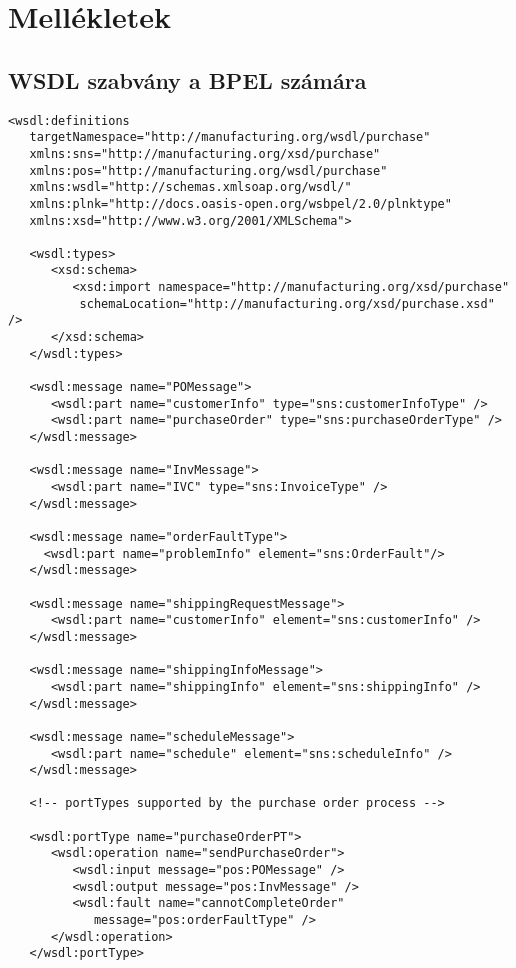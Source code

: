 \chapter{Mellékletek}

\section{WSDL szabvány a BPEL számára}
\begin{verbatim}
<wsdl:definitions
   targetNamespace="http://manufacturing.org/wsdl/purchase"
   xmlns:sns="http://manufacturing.org/xsd/purchase"
   xmlns:pos="http://manufacturing.org/wsdl/purchase"
   xmlns:wsdl="http://schemas.xmlsoap.org/wsdl/"
   xmlns:plnk="http://docs.oasis-open.org/wsbpel/2.0/plnktype"
   xmlns:xsd="http://www.w3.org/2001/XMLSchema">
   
   <wsdl:types>
      <xsd:schema>
         <xsd:import namespace="http://manufacturing.org/xsd/purchase"
          schemaLocation="http://manufacturing.org/xsd/purchase.xsd" />
      </xsd:schema>
   </wsdl:types> 

   <wsdl:message name="POMessage">
      <wsdl:part name="customerInfo" type="sns:customerInfoType" />
      <wsdl:part name="purchaseOrder" type="sns:purchaseOrderType" />
   </wsdl:message>

   <wsdl:message name="InvMessage">
      <wsdl:part name="IVC" type="sns:InvoiceType" />
   </wsdl:message>

   <wsdl:message name="orderFaultType">
     <wsdl:part name="problemInfo" element="sns:OrderFault"/>
   </wsdl:message>

   <wsdl:message name="shippingRequestMessage">
      <wsdl:part name="customerInfo" element="sns:customerInfo" />
   </wsdl:message>

   <wsdl:message name="shippingInfoMessage">
      <wsdl:part name="shippingInfo" element="sns:shippingInfo" />
   </wsdl:message>

   <wsdl:message name="scheduleMessage">
      <wsdl:part name="schedule" element="sns:scheduleInfo" />
   </wsdl:message> 

   <!-- portTypes supported by the purchase order process -->

   <wsdl:portType name="purchaseOrderPT">
      <wsdl:operation name="sendPurchaseOrder">
         <wsdl:input message="pos:POMessage" />
         <wsdl:output message="pos:InvMessage" />
         <wsdl:fault name="cannotCompleteOrder"
            message="pos:orderFaultType" />
      </wsdl:operation>
   </wsdl:portType>
   

\end{verbatim}
